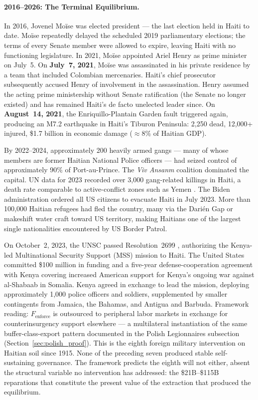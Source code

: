 \paragraph{2016--2026: The Terminal Equilibrium.}
In 2016, Jovenel Mo\"ise was elected president --- the last election held in Haiti to date. Mo\"ise repeatedly delayed the scheduled 2019 parliamentary elections; the terms of every Senate member were allowed to expire, leaving Haiti with no functioning legislature. In 2021, Mo\"ise appointed Ariel Henry as prime minister on July~5. On \textbf{July~7, 2021}, Mo\"ise was assassinated in his private residence by a team that included Colombian mercenaries. Haiti's chief prosecutor subsequently accused Henry of involvement in the assassination. Henry assumed the acting prime ministership without Senate ratification (the Senate no longer existed) and has remained Haiti's de facto unelected leader since. On \textbf{August~14, 2021}, the Enriquillo-Plantain Garden fault triggered again, producing an M7.2 earthquake in Haiti's Tiburon Peninsula: 2,250 dead, 12,000+ injured, \$1.7 billion in economic damage ($\approx$8\% of Haitian GDP).

By 2022--2024, approximately 200 heavily armed gangs --- many of whose members are former Haitian National Police officers --- had seized control of approximately 90\% of Port-au-Prince. The \textit{Viv Ansanm} coalition dominated the capital. UN data for 2023 recorded over 3,000 gang-related killings in Haiti, a death rate comparable to active-conflict zones such as Yemen \cite{icg_haiti_gangs_2024}. The Biden administration ordered all US citizens to evacuate Haiti in July 2023. More than 100,000 Haitian refugees had fled the country, many via the Darién Gap or makeshift water craft toward US territory, making Haitians one of the largest single nationalities encountered by US Border Patrol.

On October~2, 2023, the UNSC passed Resolution~2699 \cite{unsc_res_2699_mss}, authorizing the Kenya-led Multinational Security Support (MSS) mission to Haiti. The United States committed \$100 million in funding and a five-year defense-cooperation agreement with Kenya covering increased American support for Kenya's ongoing war against al-Shabaab in Somalia. Kenya agreed in exchange to lead the mission, deploying approximately 1,000 police officers and soldiers, supplemented by smaller contingents from Jamaica, the Bahamas, and Antigua and Barbuda. Framework reading: $F_{\text{enforce}}$ is outsourced to peripheral labor markets in exchange for counterinsurgency support elsewhere --- a multilateral instantiation of the same buffer-class-export pattern documented in the Polish Legionnaires subsection (Section~\ref{sec:polish_proof}). This is the eighth foreign military intervention on Haitian soil since 1915. None of the preceding seven produced stable self-sustaining governance. The framework predicts the eighth will not either, absent the structural variable no intervention has addressed: the \$21B--\$115B reparations that constitute the present value of the extraction that produced the equilibrium.

